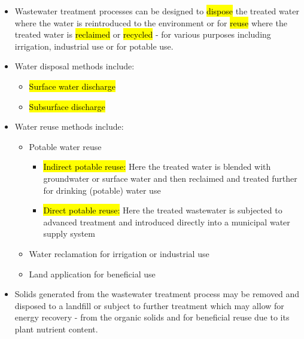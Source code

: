 \begin{itemize}
\item Wastewater treatment processes can be designed to \hl{dispose} the treated water where the water is reintroduced to the environment or for \hl{reuse} where the treated water is \hl{reclaimed} or \hl{recycled} - for various purposes including irrigation, industrial use or for potable use.
\item Water disposal methods include:\\
\begin{itemize}
\item \hl{Surface water discharge}
\item \hl{Subsurface discharge}
\end{itemize}
\item Water reuse methods include:\\
\begin{itemize}
\item Potable water reuse
\begin{itemize}
\item \hl{Indirect potable reuse:}  Here the treated water is blended with groundwater or surface water and then reclaimed and treated further 
for drinking (potable) water use
\item \hl{Direct potable reuse:}  Here the treated wastewater is subjected to advanced treatment and introduced directly into a municipal water supply system
\end{itemize}
\item Water reclamation for irrigation or industrial use\\
\item Land application for beneficial use\\
\end{itemize}
\item Solids generated from the wastewater treatment process may be removed and disposed to a landfill or subject to further treatment which may allow for energy recovery - from the organic solids and for beneficial reuse due to its plant nutrient content.\\
\end{itemize}


